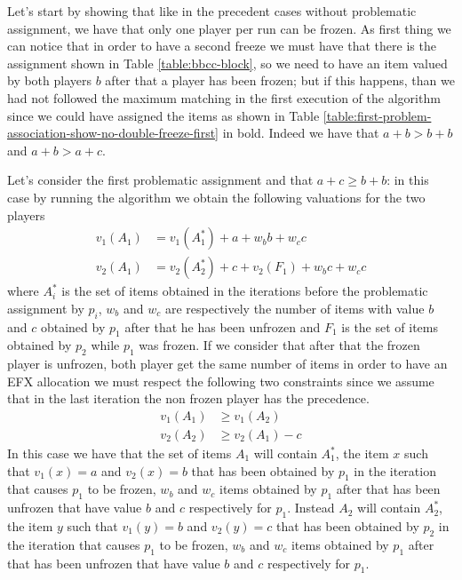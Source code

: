 Let's start by showing that like in the precedent cases without problematic assignment, we have that only one player per run can be frozen. As first thing we can notice that in order to have a second freeze we must have that there is the assignment shown in Table \ref{table:bbcc-block}, so we need to have an item valued by both players $b$ after that a player has been frozen; but if this happens, than we had not followed the maximum matching in the first execution of the algorithm since we could have assigned the items as shown in Table \ref{table:first-problem-association-show-no-double-freeze-first} in bold. Indeed we have that $a+b > b + b$ and $a+b > a+c$.

Let's consider the first problematic assignment and that $a + c \ge b + b$: in this case by running the algorithm we obtain the following valuations for the two players
\begin{align*}
    v_1(A_1) &= v_1(A_1^*) + a + w_b b + w_c c\\
    v_2(A_1) &= v_2(A_2^*) + c + v_2(F_1)+ w_b c + w_c c
\end{align*}
where $A_i^*$ is the set of items obtained in the iterations before the problematic assignment by $p_i$, $w_b$ and $w_c$ are respectively the number of items with value $b$ and $c$ obtained by $p_1$ after that he has been unfrozen and $F_1$ is the set of items obtained by $p_2$ while $p_1$ was frozen. If we consider that after that the frozen player is unfrozen, both player get the same number of items in order to have an EFX allocation we must respect the following two constraints since we assume that in the last iteration the non frozen player has the precedence. 
\begin{align}
    v_1(A_1) &\ge v_1(A_2)\label{eq:condition-1-a1>a2-ch1-first-block-ac-assignment}\\
    v_2(A_2) &\ge v_2(A_1) - c\label{eq:condition-1-a2>a1-c-ch1-first-block-ac-assignment}
\end{align}
In this case we have that the set of items $A_1$ will contain $A_1^*$, the item $x$ such that $v_1(x) = a$ and $v_2(x) = b$ that has been obtained by $p_1$ in the iteration that causes $p_1$ to be frozen, $w_b$ and $w_c$ items obtained by $p_1$ after that has been unfrozen that have value $b$ and $c$ respectively for $p_1$. Instead $A_2$ will contain $A_2^*$, the item $y$ such that $v_1(y) = b$ and $v_2(y) = c$ that has been obtained by $p_2$ in the iteration that causes $p_1$ to be frozen, $w_b$ and $w_c$ items obtained by $p_1$ after that has been unfrozen that have value $b$ and $c$ respectively for $p_1$.

